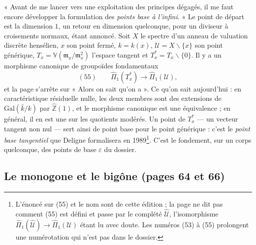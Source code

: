 \documentclass[11pt,a4paper]{article}
\begin{document}
« Avant de me lancer vers une exploitation des principes dégagés, il me faut
encore développer la formulation des \emph{points base à l'infini}. » Le point
de départ est la dimension $1$, un retour en dimension quelconque, pour un
diviseur à croisements normaux, étant annoncé. Soit $X$ le spectre d'un anneau
de valuation discrète hensélien, $x$ son point fermé, $k = k(x)$, $\mathcal{U}
= X \smallsetminus \{x\}$ son point générique, $T_x =
\mathbb{V}(\mathfrak{m}_x/\mathfrak{m}_x^2)$ l'espace tangent et $T_x^{*} = T_x
\smallsetminus \{0\}$. Il y a un morphisme canonique de groupoïdes
fondamentaux
\[
(55)\qquad \widehat{\Pi}_1(T_x^{*}) \longrightarrow \widehat{\Pi}_1(\mathcal{U}),
\]
et la page s'arrête sur « Alors on sait qu'on a ». Ce qu'on sait aujourd'hui :
en caractéristique résiduelle nulle, les deux membres sont des extensions de
$\mathrm{Gal}(\bar k/k)$ par $\widehat{\mathbb{Z}}(1)$, et le morphisme
canonique est une équivalence ; en général, il en est une sur les quotients
modérés. Un point de
$T_x^{*}$ — un vecteur tangent non nul — sert ainsi de point base pour le
point générique : c'est le \emph{point base tangentiel} que Deligne
formalisera en 1989\footnote{L'énoncé sur (55) et le nom sont de cette
édition ; la page ne dit pas comment (55) est défini et passe par le complété
$\widehat{\mathcal{U}}$, l'isomorphisme $\widehat{\Pi}_1(\widehat{\mathcal{U}})
\to \widehat{\Pi}_1(\mathcal{U})$ étant lu avec doute. Les numéros (53) à (55)
prolongent une numérotation qui n'est pas dans le dossier.}. C'est le
fondement, sur un corps quelconque, des points de base $\varepsilon$ du
dossier.

\subsection*{Le monogone et le bigône (pages 64 et 66)}
\end{document}

